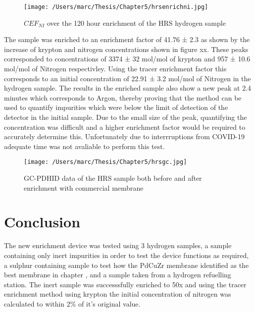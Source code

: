 \begin{landscape}
    \begin{figure}
        \centering
        \texttt{[image: /Users/marc/Thesis/Chapter5/hrsenrichni.jpg]}
        \caption{$CEF_{NI}$ over the 120 hour enrichment of the HRS hydrogen sample}
        \label{GCHRS}
    \end{figure}
\end{landscape}

The sample was enriched to an enrichment factor of 41.76 ± 2.3 as shown by the increase of krypton and nitrogen concentrations shown in figure xx. These peaks corresponded to concentrations of 3374 ± 32 \textmu mol/mol of krypton and 957 ± 10.6 \textmu mol/mol of Nitrogen respectivley. Using the tracer enrichment factor this corresponds to an initial concentration  of 22.91 ± 3.2  \textmu mol/mol of Nitrogen  in the hydrogen sample. The results in the enriched sample also show a new peak at 2.4 minutes which corresponds to Argon, thereby proving that the method can be used to quantify impurities which were below the limit of detection of the detector in the initial sample. Due to the small size of the peak, quantifying the concentration was difficult and a higher enrichment factor would be required to accurately determine this. Unfortunately due to interrruptions from COVID-19 adequate time was not avaliable to perform this test. 

\begin{figure}[H]
    \centering
    \texttt{[image: /Users/marc/Thesis/Chapter5/hrsgc.jpg]}
    \caption{GC-PDHID data of the HRS sample both before and after enrichment with commercial membrane}
    \label{HRSGCENRICH}
\end{figure}

\section{Conclusion}
The new enrichment device was tested using 3 hydrogen samples, a sample containing only inert impurities in order to test the device functions as required, a sulphur containing sample to test how the PdCuZr membrane identified as the best membrane in chapter \label{proc-testingchapref}, and a sample taken from a hydrogen refuelling station. The inert sample was successsfully enriched to 50x and using the tracer enrichment method using krypton the initial concentration of nitrogen was calculated to within 2\% of it's original value. 

